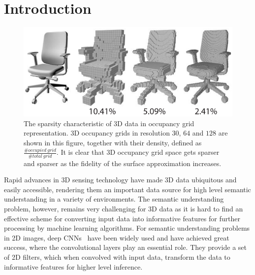 \section{Introduction}
\label{sec:introduction}

\vspace{-0.2cm}

\begin{figure}
	\vspace{-2.0cm}
	\begin{center}
		\includegraphics[width=0.9\linewidth]{figures/3d_sparsity}
	\end{center}
	\vspace{-0.5cm}
	\caption{The sparsity characteristic of 3D data in occupancy grid representation. 3D occupancy grids in resolution $30$, $64$ and $128$ are shown in this figure, together with their density, defined as $\frac{\#occupied~grid}{\#total~grid}$. It is clear that 3D occupancy grid space gets sparser and sparser as the fidelity of the surface approximation increases.}
	\label{fig:3d_sparsity}
	\vspace{-0.3cm}
\end{figure}

Rapid advances in 3D sensing technology have made 3D data ubiquitous and easily accessible, rendering them an important data source for high level semantic understanding in a variety of environments. The semantic understanding problem, however, remains very challenging for 3D data as it is hard to find an effective scheme for converting input data into informative features for further processing by machine learning algorithms. For semantic understanding problems in 2D images, deep CNNs~\cite{Lecun_IEEE98_Gradient} have been widely used and have achieved great success, where the convolutional layers play an essential role. They provide a set of 2D filters, which when convolved with input data, transform the data to informative features for higher level inference.

